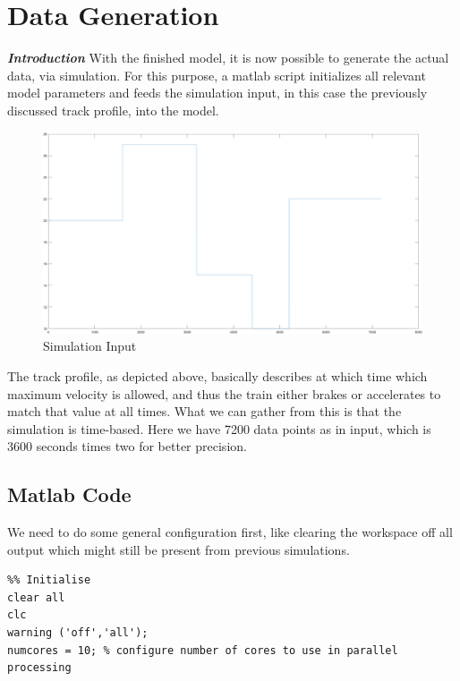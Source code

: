 \chapter{Data Generation}
\label{chap:DataGeneration}
\par\noindent
\textit{\textbf{Introduction}} With the finished model, it is now possible to generate the actual data, via simulation. For this purpose, a matlab script initializes all relevant model parameters and feeds the simulation input, in this case the previously discussed track profile, into the model. 

\begin{figure}[H]
	\centering
	\includegraphics[width=\linewidth]{./pic/input}
	\caption{Simulation Input}
	\label{fig:siminput}
\end{figure}

\par\noindent
The track profile, as depicted above, basically describes at which time which maximum velocity is allowed, and thus the train either brakes or accelerates to match that value at all times. What we can gather from this is that the simulation is time-based. Here we have 7200 data points as in input, which is 3600 seconds times two for better precision.

\section{Matlab Code}
\label{sec:MatlabCode}
\par\noindent
We need to do some general configuration first, like clearing the workspace off all output which might still be present from previous simulations. 

\begin{lstlisting}
%% Initialise
clear all
clc
warning ('off','all');
numcores = 10; % configure number of cores to use in parallel processing
\end{lstlisting}

